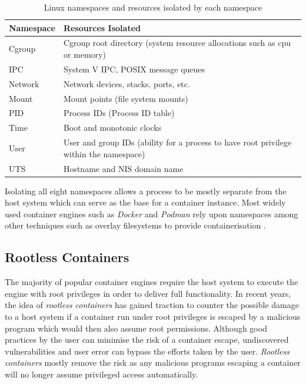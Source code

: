 \documentclass[hidelinks]{report}
\begin{document}
\begin{table}[h]
	\centering
	\begin{tabular}{ll}
		\toprule
		\textbf{Namespace} & \textbf{Resources Isolated} \\
		\midrule
		Cgroup & Cgroup root directory (system resource allocations such as cpu or memory) \\
		IPC & System V IPC, POSIX message queues \\
		Network & Network devices, stacks, ports, etc. \\
		Mount  & Mount points (file system mounts) \\
		PID & Process IDs (Process ID table) \\
		Time & Boot and monotonic clocks \\
		User & User and group IDs (ability for a process to have root privilege within the namespace) \\
		UTS & Hostname and NIS domain name \\
		\bottomrule
	\end{tabular}
	\caption{Linux namespaces and resources isolated by each namespace}
	\label{tab:table2}
\end{table}

Isolating all eight namespaces allows a process to be mostly separate from the host system which can serve as the base for a container instance. Most widely used container engines such as \textit{Docker} and \textit{Podman} rely upon namespaces among other techniques such as overlay filesystems to provide containerisation \cite{dockerUnderlying}\cite{podmanUnderlying}.

\subsection{Rootless Containers}
The majority of popular container engines require the host system to execute the engine with root privileges in order to deliver full functionality. In recent years, the idea of \textit{rootless containers} has gained traction to counter the possible damage to a host system if a container run under root privileges is escaped by a malicious program which would then also assume root permissions. Although good practices by the user can minimise the risk of a container escape, undiscovered vulnerabilities and user error can bypass the efforts taken by the user. \textit{Rootless containers} mostly remove the risk as any malicious programs escaping a container will no longer assume privileged access automatically.
\end{document}
